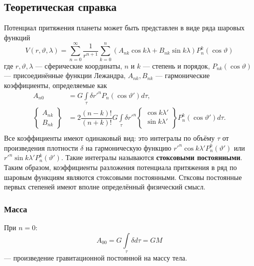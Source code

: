 \documentclass[11pt, a4paper,addpoints]{exam}
\theoremstyle{remark}
\renewcommand{\theta}{\vartheta}
\begin{document}
    \subsection*{\centering Теоретическая справка}
    Потенциал притяжения планеты может быть представлен в виде ряда шаровых функций
    \begin{equation*}
        V\left( r, \theta, \lambda \right) = \sum\limits_{n=0}^{\infty} \dfrac{1}{r^{n+1}}
        \sum\limits_{k=0}^{n}\left( A_{nk}\cos{k\lambda} + B_{nk}\sin{k\lambda} \right) P_n^k \left(
        \cos\theta \right)
    \end{equation*}
    где $r, \theta, \lambda$ --- сферические координаты, $n$ и $k$ --- степень и порядок,
    $P_{nk}\left( \cos{\theta} \right)$ --- присоединённые функции
    Лежандра, $A_{nk}, B_{nk}$ --- гармонические коэффициенты, определяемые как 
    \begin{equation*}
    \begin{aligned}
        A_{n0} &= G\int\limits_\tau \delta {r'}^n P_n \left( \cos{\theta'} \right) d\tau, \\
        \begin{Bmatrix}
            A_{nk} \\ B_{nk}
        \end{Bmatrix} &= 
        2 \dfrac{\left( n - k \right)!}{\left( n + k \right)!}
        G \int\limits_\tau \delta {r'}^n 
        \begin{Bmatrix}
            \cos{k\lambda'} \\
            \sin{k\lambda'} \\
        \end{Bmatrix}
        P_n^k \left( \cos{\theta'} \right) d\tau. \\
    \end{aligned}
    \end{equation*}
    Все коэффициенты имеют одинаковый вид: это интегралы по объёму $\tau$ от произведения плотности
    $\delta$ на гармоническую функцию ${r'}^n \cos{k\lambda'} P_n^k\left( \theta' \right)$ или
    ${r'}^n \sin{k\lambda'} P_n^k\left( \theta' \right)$. Такие интегралы называются  
    \textbf{стоксовыми постоянными}. Таким образом, коэффициенты разложения потенциала притяжения в
    ряд по шаровым функциям являются стоксовыми постоянными. Стксовы постоянные первых степеней
    имеют вполне определённый физический смысл\cite{Ogorodova2013}.

    \subsubsection*{Масса}
    При $n = 0$:
    \begin{equation*}
        A_{00} = G \int\limits_\tau \delta d\tau = GM
    \end{equation*}
    --- произведение гравитационной постоянной на массу тела. 
\end{document}
